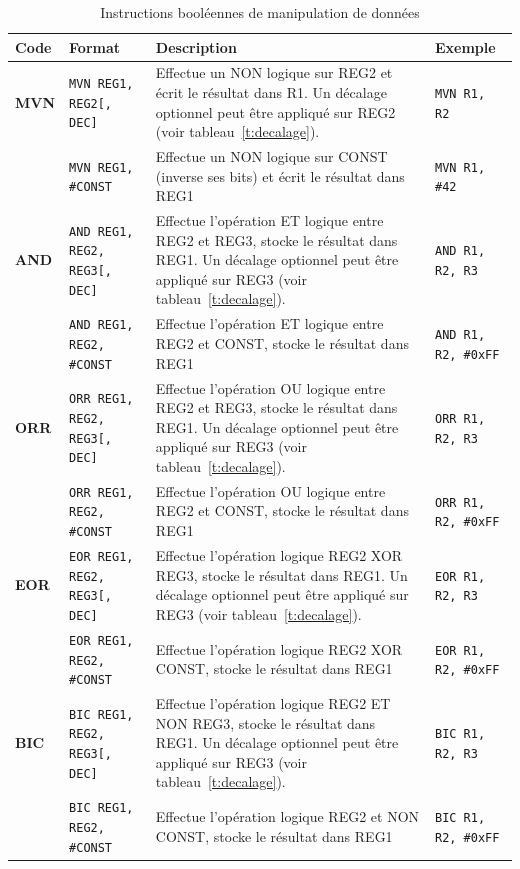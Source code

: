 \documentclass{tufte-handout}
\begin{document}
\begin{table}
\begin{tabular}{l|l|p{7.5cm}l}
Code & Format & Description & Exemple \\ \hline
\textbf{MVN} & \texttt{MVN REG1, REG2[, DEC]} 	& Effectue un NON logique sur REG2 et écrit le résultat dans R1. Un décalage optionnel peut être appliqué sur REG2 (voir tableau~\ref{t:decalage}). & \texttt{MVN R1, R2} \\
 			 & \texttt{MVN REG1, \#CONST} 			& Effectue un NON logique sur CONST (inverse ses bits) et écrit le résultat dans REG1 & \texttt{MVN R1, \#42} \\
\hline
\textbf{AND} & \texttt{AND REG1, REG2, REG3[, DEC]} 	& Effectue l'opération ET logique entre REG2 et REG3, stocke le résultat dans REG1. Un décalage optionnel peut être appliqué sur REG3 (voir tableau~\ref{t:decalage}). & \texttt{AND R1, R2, R3} \\
 			 & \texttt{AND REG1, REG2, \#CONST} 			& Effectue l'opération ET logique entre REG2 et CONST, stocke le résultat dans REG1 & \texttt{AND R1, R2, \#0xFF} \\
\hline
\textbf{ORR} & \texttt{ORR REG1, REG2, REG3[, DEC]} 	& Effectue l'opération OU logique entre REG2 et REG3, stocke le résultat dans REG1. Un décalage optionnel peut être appliqué sur REG3 (voir tableau~\ref{t:decalage}). & \texttt{ORR R1, R2, R3} \\
 			 & \texttt{ORR REG1, REG2, \#CONST} 			& Effectue l'opération OU logique entre REG2 et CONST, stocke le résultat dans REG1 & \texttt{ORR R1, R2, \#0xFF} \\
\hline
\textbf{EOR} & \texttt{EOR REG1, REG2, REG3[, DEC]} 	& Effectue l'opération logique REG2 XOR REG3, stocke le résultat dans REG1. Un décalage optionnel peut être appliqué sur REG3 (voir tableau~\ref{t:decalage}). & \texttt{EOR R1, R2, R3} \\
 			 & \texttt{EOR REG1, REG2, \#CONST} 			& Effectue l'opération logique REG2 XOR CONST, stocke le résultat dans REG1 & \texttt{EOR R1, R2, \#0xFF} \\
\hline
\textbf{BIC} & \texttt{BIC REG1, REG2, REG3[, DEC]} 	& Effectue l'opération logique REG2 ET NON REG3, stocke le résultat dans REG1. Un décalage optionnel peut être appliqué sur REG3 (voir tableau~\ref{t:decalage}). & \texttt{BIC R1, R2, R3} \\
 			 & \texttt{BIC REG1, REG2, \#CONST} 			& Effectue l'opération logique REG2 et NON CONST, stocke le résultat dans REG1 & \texttt{BIC R1, R2, \#0xFF} \\
\hline

\end{tabular}
\label{t:databool}
\caption{Instructions booléennes de manipulation de données}
\end{table}
\end{document}
